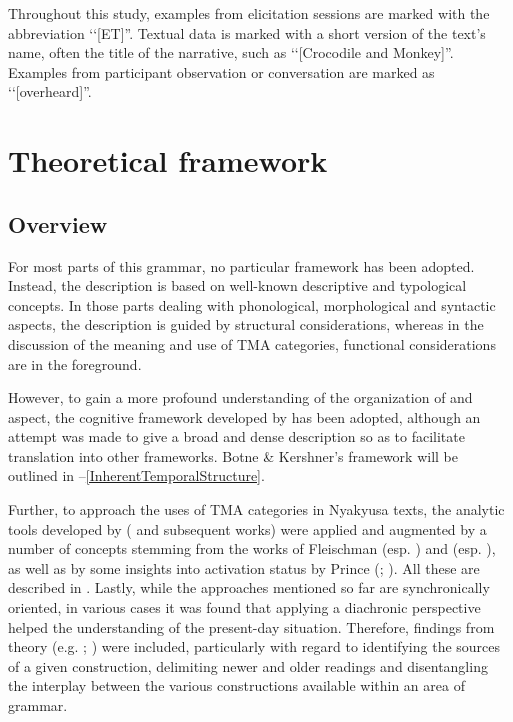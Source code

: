 Throughout this study, examples from elicitation sessions are marked with the abbreviation \lq\lq[ET]''. Textual data is marked with a short version of the text's name, often the title of the narrative, such as \lq\lq[Crocodile and Monkey]''. Examples from participant observation or conversation are marked as \lq\lq[overheard]''.
\section{Theoretical framework}\label{TheoreticalFramework}
\subsection{Overview}
For most parts of this grammar, no particular framework has been adopted. Instead, the description is based on well-known descriptive and typological concepts. In those parts dealing with phonological, morphological and syntactic aspects, the description is guided by structural considerations, whereas in the discussion of the meaning and use of TMA categories, functional considerations are in the foreground.

However, to gain a more profound understanding of the organization of  and aspect, the cognitive framework developed by \citet{BotneRKershnerT2008} has been adopted, although an attempt was made to give a broad and dense description so as to facilitate translation into other frameworks. Botne \& Kershner's framework will be outlined in --\ref{InherentTemporalStructure}.
 
Further, to approach the uses of TMA categories in Nyakyusa  texts, the analytic tools developed by \citeauthor{LabovWWaletzkyJ1967} (\citeyear{LabovWWaletzkyJ1967} and subsequent works) were applied and augmented by a number of concepts stemming from the works of Fleischman (esp. \citeyear{FleischmanS1990}) and \citeauthor{LongacreR1990} (esp. \citeyear{LongacreR1990}), as well as by some insights into activation status by Prince (\citeyear{PrinceEF1981}; \citeyear{PrinceEF1992}). All these are described in . Lastly, while the approaches mentioned so far are synchronically oriented, in various cases it was found that applying a diachronic perspective helped the understanding of the present-day situation. Therefore, findings from  theory (e.g. \citealt{HeineBClaudiUHuennemeyerF1991}; \citealt{BybeePerkinsPaglucia1994}) were included, particularly with regard to identifying the sources of a given construction, delimiting newer and older readings and disentangling the interplay between the various constructions available within an area of grammar.
